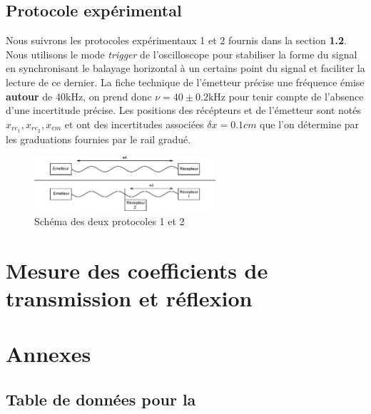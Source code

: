 \documentclass[12pt]{article}
\begin{document}
\subsection{Protocole expérimental}
Nous suivrons les protocoles expérimentaux 1 et 2 fournis dans la section \textbf{1.2}. Nous utilisons le mode \textit{trigger}
de l'oscilloscope pour stabiliser la forme du signal en synchronisant le balayage horizontal à un certains point du signal et faciliter la lecture de ce dernier.
La fiche technique de l'émetteur précise une fréquence émise \textbf{autour} de 40kHz, on prend donc $\nu = 40 \pm 0.2 \text{kHz}$ pour tenir compte de l'absence d'une incertitude précise. 
Les positions des récépteurs et de l'émetteur sont notés $x_{re_1}, x_{re_2}, x_{em}$ et ont des incertitudes associées
$\delta x = 0.1cm$ que l'on détermine par les graduations fournies par le rail gradué. 
\begin{figure}[!htbp]
	\centering
	\includegraphics[width=0.6\textwidth]{img/schema}
	\hfill
	\caption{Schéma des deux protocoles 1 et 2}
\end{figure}
\section{Mesure des coefficients de transmission et réflexion}


\break
\section*{Annexes}
\subsection*{Table de données pour la }
\end{document}
